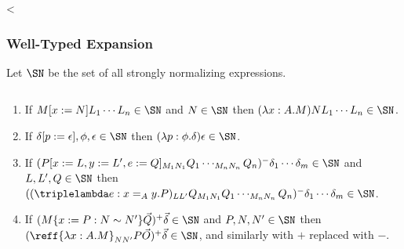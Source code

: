 <

\subsubsection{Well-Typed Expansion}

Let $\SN$ be the set of all strongly normalizing expressions.

\begin{proposition}
\label{prop:SN}
$ $
\begin{enumerate}
\item
\label{prop:SNT}
If $M[x:=N]L_1 \cdots L_n \in \SN$ and $N \in \SN$ then $(\lambda x:A.M)NL_1 \cdots L_n \in \SN$.
\item
\label{prop:SNP}
If $\delta[p:=\epsilon], \phi, \epsilon \in \SN$ then $(\lambda p:\phi.\delta)\epsilon \in \SN$.
\item
If $(P[x:=L, y:=L', e:=Q]_{M_1 N_1} Q_1 \cdots_{M_n N_n} Q_n)^- \delta_1 \cdots \delta_m \in \SN$ and $L, L', Q \in \SN$ then $((\triplelambda e:x =_A y.P)_{L L'} Q_{M_1 N_1} Q_1 \cdots_{M_n N_n} Q_n)^- \delta_1 \cdots \delta_m \in \SN$.
\item
\label{prop:SNE'}
If $(M \{ x:=P : N \sim N' \} \vec{Q})^+ \vec{\delta} \in \SN$ and $P, N, N' \in \SN$ then $(\reff{\lambda x:A.M}_{N N'} P \vec{O})^+ \vec{\delta} \in \SN$, and similarly with $+$ replaced with $-$.
\end{enumerate}
\end{proposition}


